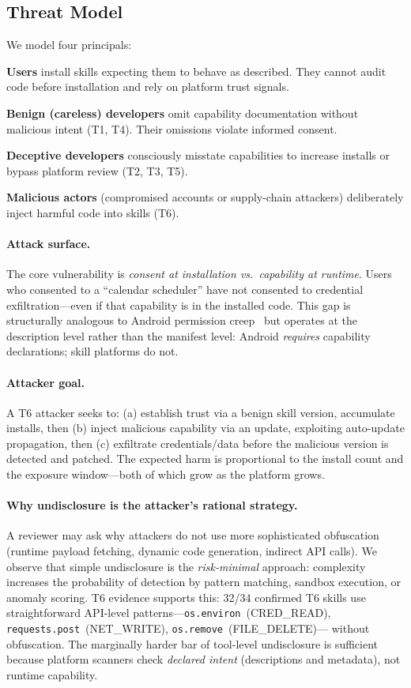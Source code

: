 \subsection{Threat Model}

We model four principals:

\textbf{Users} install skills expecting them to behave as described.
They cannot audit code before installation and rely on platform trust signals.

\textbf{Benign (careless) developers} omit capability documentation
without malicious intent (T1, T4). Their omissions violate informed consent.

\textbf{Deceptive developers} consciously misstate capabilities to
increase installs or bypass platform review (T2, T3, T5).

\textbf{Malicious actors} (compromised accounts or supply-chain
attackers) deliberately inject harmful code into skills (T6).

\paragraph{Attack surface.}
The core vulnerability is \emph{consent at installation vs.\ capability
at runtime}. Users who consented to a ``calendar scheduler'' have not
consented to credential exfiltration---even if that capability is
in the installed code. This gap is structurally analogous to Android
permission creep~\cite{felt2011android} but operates at the description
level rather than the manifest level: Android \emph{requires} capability
declarations; skill platforms do not.

\paragraph{Attacker goal.}
A T6 attacker seeks to: (a) establish trust via a benign skill version,
accumulate installs, then (b) inject malicious capability via an update,
exploiting auto-update propagation, then (c) exfiltrate credentials/data
before the malicious version is detected and patched.
The expected harm is proportional to the install count and the exposure
window---both of which grow as the platform grows.

\paragraph{Why undisclosure is the attacker's rational strategy.}
A reviewer may ask why attackers do not use more sophisticated obfuscation
(runtime payload fetching, dynamic code generation, indirect API calls).
We observe that simple undisclosure is the \emph{risk-minimal} approach:
complexity increases the probability of detection by
pattern matching, sandbox execution, or anomaly scoring.
T6 evidence supports this: 32/34 confirmed T6 skills use
straightforward API-level patterns---\texttt{os.environ}~(CRED\_READ),
\texttt{requests.post}~(NET\_WRITE), \texttt{os.remove}~(FILE\_DELETE)---
without obfuscation. The marginally harder bar of tool-level
undisclosure is sufficient because platform scanners check
\emph{declared intent} (descriptions and metadata), not runtime capability.

